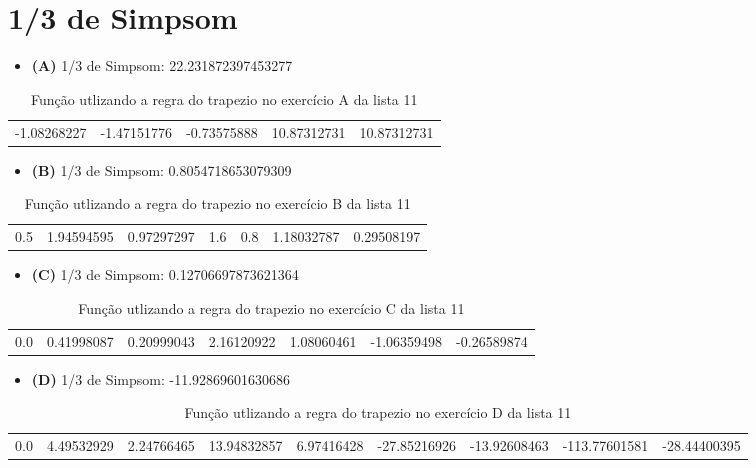 \documentclass[12pt]{article}
\begin{document}
\section{1/3 de Simpsom}


\begin{itemize}
    \item \textbf{(A)} 1/3 de Simpsom: 22.231872397453277
\end{itemize}
\begin{table}[ht]
\centering
\begin{tabular}{|lllll|}
 -1.08268227 & -1.47151776 & -0.73575888 & 10.87312731 & 10.87312731
\end{tabular}
    \caption{Função utlizando a regra do trapezio no exercício A da lista 11}
\end{table}


\begin{itemize}
    \item \textbf{(B)} 1/3 de Simpsom: 0.8054718653079309
\end{itemize}
\begin{table}[ht]
\centering
\begin{tabular}{|lllllll|}
     0.5 & 1.94594595 &  0.97297297 & 1.6 & 0.8 & 1.18032787 & 0.29508197
\end{tabular}
    \caption{Função utlizando a regra do trapezio no exercício B da lista 11}
\end{table}


\begin{itemize}
    \item \textbf{(C)} 1/3 de Simpsom: 0.12706697873621364
\end{itemize}
\begin{table}[ht]
\centering
\begin{tabular}{|lllllll|}
     0.0 & 0.41998087 &  0.20999043 & 2.16120922 & 1.08060461 & -1.06359498 & -0.26589874
\end{tabular}
    \caption{Função utlizando a regra do trapezio no exercício C da lista 11}
\end{table}


\begin{itemize}
    \item \textbf{(D)} 1/3 de Simpsom: -11.92869601630686
\end{itemize}
\begin{table}[ht]
\centering
\begin{tabular}{|lllllllll|}
    0.0 & 4.49532929  &  2.24766465 & 13.94832857 & 6.97416428 & -27.85216926 & -13.92608463 & -113.77601581  & -28.44400395
\end{tabular}
    \caption{Função utlizando a regra do trapezio no exercício D da lista 11}
\end{table}
\end{document}
